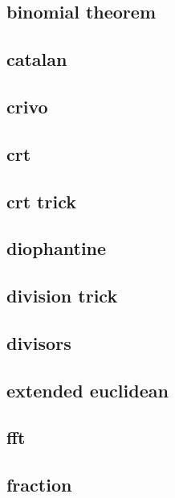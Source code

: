 \subsection{binomial theorem}
\raggedbottom
\hrulefill
\subsection{catalan}
\raggedbottom
\hrulefill
\subsection{crivo}
\raggedbottom
\hrulefill
\subsection{crt}
\raggedbottom
\hrulefill
\subsection{crt trick}
\raggedbottom
\hrulefill
\subsection{diophantine}
\raggedbottom
\hrulefill
\subsection{division trick}
\raggedbottom
\hrulefill
\subsection{divisors}
\raggedbottom
\hrulefill
\subsection{extended euclidean}
\raggedbottom
\hrulefill
\subsection{fft}
\raggedbottom
\hrulefill
\subsection{fraction}
\raggedbottom
\hrulefill
